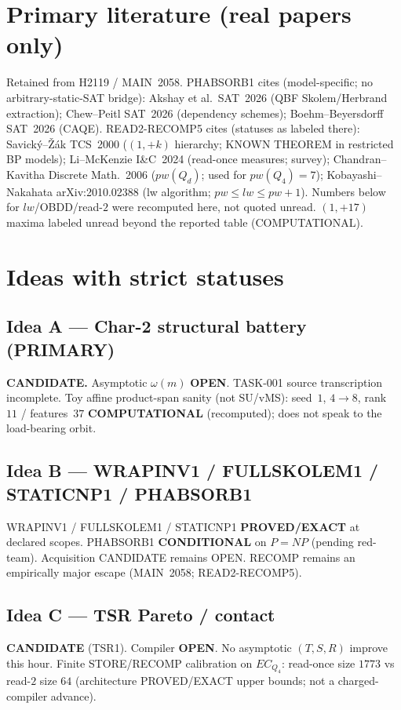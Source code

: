 \documentclass[11pt]{article}
\begin{document}
\section*{Primary literature (real papers only)}
Retained from H2119 / MAIN~2058.
PHABSORB1 cites (model-specific; no arbitrary-static-SAT bridge):
Akshay et al.\ SAT~2026 (QBF Skolem/Herbrand extraction);
Chew--Peitl SAT~2026 (dependency schemes);
Boehm--Beyersdorff SAT~2026 (CAQE).
READ2-RECOMP5 cites (statuses as labeled there):
Savick\'y--\v{Z}\'ak TCS~2000 ($(1,+k)$ hierarchy; KNOWN THEOREM in restricted BP models);
Li--McKenzie I\&C~2024 (read-once measures; survey);
Chandran--Kavitha Discrete Math.~2006 ($pw(Q_d)$; used for $pw(Q_4)=7$);
Kobayashi--Nakahata arXiv:2010.02388 (lw algorithm; $pw\le lw\le pw+1$).
Numbers below for $lw$/OBDD/read-$2$ were recomputed here, not quoted unread.
$(1,+17)$ maxima labeled unread beyond the reported table (COMPUTATIONAL).

\section*{Ideas with strict statuses}
\subsection*{Idea A --- Char-2 structural battery (PRIMARY)}
\textbf{CANDIDATE.} Asymptotic $\omega(m)$ \textbf{OPEN}. TASK-001 source transcription incomplete.
Toy affine product-span sanity (not SU/vMS): seed~$1$, $4\to8$, rank~$11$ / features~$37$
\textbf{COMPUTATIONAL} (recomputed); does not speak to the load-bearing orbit.

\subsection*{Idea B --- WRAPINV1 / FULLSKOLEM1 / STATICNP1 / PHABSORB1}
WRAPINV1 / FULLSKOLEM1 / STATICNP1 \textbf{PROVED/EXACT} at declared scopes.
PHABSORB1 \textbf{CONDITIONAL} on $P=NP$ (pending red-team). Acquisition CANDIDATE remains OPEN.
RECOMP remains an empirically major escape (MAIN~2058; READ2-RECOMP5).

\subsection*{Idea C --- TSR Pareto / contact}
\textbf{CANDIDATE} (TSR1). Compiler \textbf{OPEN}. No asymptotic $(T,S,R)$ improve this hour.
Finite STORE/RECOMP calibration on $EC_{Q_4}$: read-once size $1773$ vs read-$2$ size $64$
(architecture PROVED/EXACT upper bounds; not a charged-compiler advance).
\end{document}
